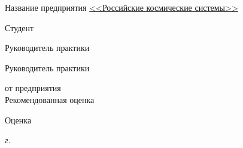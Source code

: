 \begin{titlepage}
	
	\vspace{1.3mm}
	
	
	Название предприятия \uline{\hfill <<Российские космические системы>> \hfill} \\ 
	
	\vspace{10.8mm}
	
	Студент \hfill
	\uline{} 
	\uline{}
	
	\vspace{1mm}
	
	Руководитель практики \hfill
	\uline{} 
	\uline{}
	
	\vspace{1mm}
	
	Руководитель практики
	
	\vspace{1.5pt}
	
	от предприятия \hfill
	\uline{} 
	\uline{}\\
	
	Рекомендованная оценка \uline{\hspace*{5cm}}
	
	\vspace{3.3mm} 
	
	Оценка \uline{\hspace*{8.9cm}} \\
	
	\vspace{1.3mm} 
	
	\centering 
	{
		\textit{{\the\year} г.}
	}
	
	
\end{titlepage}